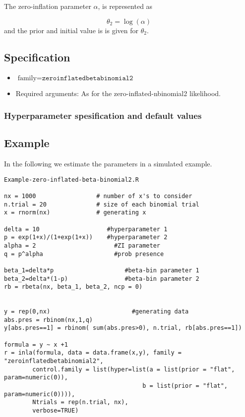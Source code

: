 \documentclass[a4paper,11pt]{article}
\begin{document}
\vspace{5mm}

\noindent
The zero-inflation parameter $\alpha$, is represented as

\begin{displaymath}
    \theta_2 = \log(\alpha)
\end{displaymath}
and the prior and initial value is is given for $\theta_{2}$.

\subsection*{Specification}

\begin{itemize}
\item $\text{family}=\texttt{zeroinflatedbetabinomial2}$
\item Required arguments: As for the zero-inflated-nbinomial2
    likelihood.
\end{itemize}

\subsubsection*{Hyperparameter spesification and default values}


\subsection*{Example}

In the following we estimate the parameters in a simulated example.

\begin{verbatim}
Example-zero-inflated-beta-binomial2.R

nx = 1000                 # number of x's to consider
n.trial = 20              # size of each binomial trial
x = rnorm(nx)             # generating x

delta = 10                   #hyperparameter 1
p = exp(1+x)/(1+exp(1+x))    #hyperparameter 2
alpha = 2                      #ZI parameter
q = p^alpha                    #prob presence

beta_1=delta*p                    #beta-bin parameter 1
beta_2=delta*(1-p)                #beta-bin parameter 2                                 
rb = rbeta(nx, beta_1, beta_2, ncp = 0)

        
y = rep(0,nx)                       #generating data                    
abs.pres = rbinom(nx,1,q)
y[abs.pres==1] = rbinom( sum(abs.pres>0), n.trial, rb[abs.pres==1])

formula = y ~ x +1
r = inla(formula, data = data.frame(x,y), family = "zeroinflatedbetabinomial2",
        control.family = list(hyper=list(a = list(prior = "flat", param=numeric(0)),
                                       b = list(prior = "flat", param=numeric(0)))),
        Ntrials = rep(n.trial, nx),
        verbose=TRUE)
\end{verbatim}
\end{document}
